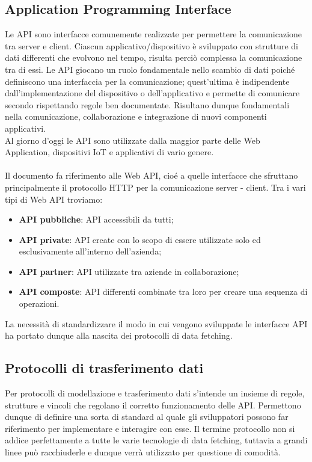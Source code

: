 \subsection{Application Programming Interface}
 Le API sono interfacce comunemente realizzate per permettere la comunicazione tra server e client. Ciascun applicativo/dispositivo è sviluppato con strutture di dati differenti che evolvono nel tempo, risulta perciò complessa la comunicazione tra di essi. Le API giocano un ruolo fondamentale nello scambio di dati poiché definiscono una interfaccia per la comunicazione; quest'ultima è indipendente dall'implementazione del dispositivo o dell'applicativo e permette di comunicare secondo rispettando regole ben documentate. Risultano dunque fondamentali nella comunicazione, collaborazione e integrazione di nuovi componenti applicativi.\\
 Al giorno d'oggi le API sono utilizzate dalla maggior parte delle Web Application, dispositivi IoT e applicativi di vario genere.\\ \\
 Il documento fa riferimento alle Web API, cioé a quelle interfacce che sfruttano principalmente il protocollo HTTP per la comunicazione server - client. Tra i vari tipi di Web API troviamo:
 \begin{itemize}
   \item \textbf{API pubbliche}: API accessibili da tutti;
   \item \textbf{API private}: API create con lo scopo di essere utilizzate solo ed esclusivamente all'interno dell'azienda;
   \item \textbf{API partner}: API utilizzate tra aziende in collaborazione;
   \item \textbf{API composte}: API differenti combinate tra loro per creare una sequenza di operazioni.
 \end{itemize}
La necessità di standardizzare il modo in cui vengono sviluppate le interfacce API ha portato dunque alla nascita dei protocolli di data fetching.
\subsection{Protocolli di trasferimento dati}
Per protocolli di modellazione e trasferimento dati s'intende un insieme di regole, strutture e vincoli che regolano il corretto funzionamento delle API. Permettono dunque di definire una sorta di standard al quale gli sviluppatori possono far riferimento per implementare e interagire con esse. Il termine protocollo non si addice perfettamente a tutte le varie tecnologie di data fetching, tuttavia a grandi linee può racchiuderle e dunque verrà utilizzato per questione di comodità.
